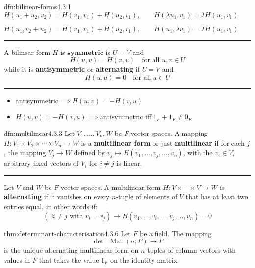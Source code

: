 \documentclass[landscape, 8pt]{extarticle}
\DeclareMathOperator{\Mat}{Mat}
\begin{document}
\begin{multicols}{3}
\begin{dfn}{dfn:bilinear-forms}{4.3.1}
    \vspace{5pt}
        $H(u_{1} + u_{2}, v_{2}) = H(u_{1}, v_{1}) + H(u_{2}, v_{1}), \qquad H(\lambda u_{1}, v_{1}) = \lambda H(u_{1}, v_{1})$

        $H(u_{1}, v_{2} + u_{2}) = H(u_{1}, v_{1}) + H(u_{2}, v_{1}), \qquad H(u_{1},\lambda v_{1}) = \lambda H(u_{1}, v_{1})$
    \vspace{5pt}
    \noindent\rule{\textwidth}{0.2pt}
    \vspace{-10pt}
    A bilinear form $H$ is \textbf{symmetric} is $U = V$ and
    \[H(u,v) = H(v,u)\quad \text{for all } u,v\in U\]
    while it is \textbf{antisymmetric} or \textbf{alternating} if $U = V$ and
    \[H(u, u) = 0 \quad\text{for all } u\in U\]

    \vspace{-7pt}
    \noindent\rule{\textwidth}{0.2pt}
    \vspace{-10pt}
    \begin{itemize}[leftmargin=*]
        \item antisymmetric$\implies H(u, v) = -H(v, u)$
        \item $H(u, v) = -H(v, u) \implies \text{antisymmetric}$ iff $1_{F} + 1_{F} \ne 0_{F}$
    \end{itemize}
\end{dfn}

\vspace{-5pt}
\begin{dfn}{dfn:multilinear}{4.3.3}
    Let $V_{1},\dots,V_{n}, W$ be $F$-vector spaces. A mapping $H : V_{1} \times V_{2} \times \cdots \times V_{n} \to W$ is a \textbf{multilinear form} or just \textbf{multilinear} if for each $j$, the mapping $V_{j}\to W$ defined by $v_{j}\mapsto H(v_{1},\dots,v_{j},\dots,v_{n})$, with the $v_{i}\in V_{i}$ arbitrary fixed vectors of $V_{i}$ for $i\ne j$ is linear. 

    \noindent\rule{\textwidth}{0.2pt}
    Let $V$ and $W$ be $F$-vector spaces. A multilinear form $ H : V \times \cdots \times V \to W$ is \textbf{alternating} if it vanishes on every $n$-tuple of elements of $V$ that has at least two entries equal, in other words if:
    \[(\exists i\ne j \text{ with } v_{i} = v_{j})\to H(v_{1},\dots,v_{i},\dots,v_{j},\dots,v_{n}) = 0\]
\end{dfn}

\newpage
\begin{thm}{thm:determinant-characterisation}{4.3.6}
    \vspace{-5pt}
    Let $F$ be a field. The mapping
    \[\det : \Mat(n;F) \to F\]
    is the unique alternating multilinear form on $n$-tuples of column vectors with values in $F$ that takes the value $1_{F}$ on the identity matrix
\end{thm}


\end{multicols}
\end{document}
